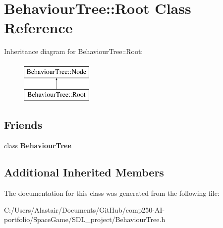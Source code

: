 \hypertarget{class_behaviour_tree_1_1_root}{}\section{Behaviour\+Tree\+:\+:Root Class Reference}
\label{class_behaviour_tree_1_1_root}
Inheritance diagram for Behaviour\+Tree\+:\+:Root\+:\begin{figure}[H]
\begin{center}
\leavevmode
\includegraphics[height=2.000000cm]{class_behaviour_tree_1_1_root}
\end{center}
\end{figure}
\subsection*{Friends}
\begin{DoxyCompactItemize}
\item 
\mbox{\label{class_behaviour_tree_1_1_root_ae563b66972c2eaf29474aa74fffa1d6f}} 
class {\bfseries Behaviour\+Tree}
\end{DoxyCompactItemize}
\subsection*{Additional Inherited Members}


The documentation for this class was generated from the following file\+:\begin{DoxyCompactItemize}
\item 
C\+:/\+Users/\+Alastair/\+Documents/\+Git\+Hub/comp250-\/\+A\+I-\/portfolio/\+Space\+Game/\+S\+D\+L\+\_\+project/Behaviour\+Tree.\+h\end{DoxyCompactItemize}
